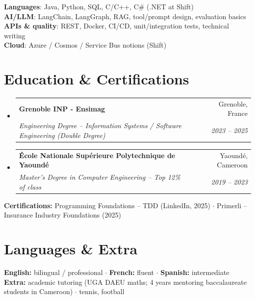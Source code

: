 \documentclass[letterpaper,10.5pt]{article}
\makeatletter
\newcommand{\resumeSubheading}[4]{
  \vspace{-1pt}\item
    \begin{tabular*}{0.97\textwidth}[t]{l@{\extracolsep{\fill}}r}
      \textbf{#1} & #2 \\
      \textit{\small#3} & \textit{\small #4} \\
    \end{tabular*}\vspace{-5pt}
}
\newcommand{\resumeSubHeadingListStart}{\begin{itemize}[leftmargin=0.15in, label={}]}
\newcommand{\resumeSubHeadingListEnd}{\end{itemize}}
\makeatother
\begin{document}
\begin{itemize}[leftmargin=0.15in, label={}]
  \small{\item{
\textbf{Languages}: Java, Python, SQL, C/C++, C\# (.NET at Shift) \\
\textbf{AI/LLM}: LangChain, LangGraph, RAG, tool/prompt design, evaluation basics \\
\textbf{APIs \& quality}: REST, Docker, CI/CD, unit/integration tests, technical writing \\
\textbf{Cloud}: Azure / Cosmos / Service Bus notions (Shift)
  }}
\end{itemize}

\section{Education \& Certifications}

\resumeSubHeadingListStart
  \resumeSubheading
    {Grenoble INP - Ensimag}{Grenoble, France}
    {Engineering Degree -- Information Systems / Software Engineering (Double Degree)}{2023 -- 2025}
  \resumeSubheading
    {\'Ecole Nationale Sup\'erieure Polytechnique de Yaound\'e}{Yaound\'e, Cameroon}
    {Master's Degree in Computer Engineering -- Top 12\% of class}{2019 -- 2023}
\resumeSubHeadingListEnd
\small{
\textbf{Certifications:} Programming Foundations -- TDD (LinkedIn, 2025) $\cdot$ Primerli -- Insurance Industry Foundations (2025)
}

\section{Languages \& Extra}
\small{
\textbf{English:} bilingual / professional $\cdot$ \textbf{French:} fluent $\cdot$ \textbf{Spanish:} intermediate \\
\textbf{Extra:} academic tutoring (UGA DAEU maths; 4 years mentoring baccalaureate students in Cameroon) $\cdot$ tennis, football
}
\end{document}
